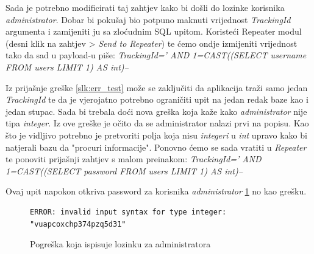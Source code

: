 Sada je potrebno modificirati taj zahtjev kako bi došli do lozinke korisnika \textit{administrator}. Dobar bi pokušaj bio potpuno maknuti vrijednost \textit{TrackingId} argumenta i zamijeniti ju sa zloćudnim SQL upitom.
Koristeći Repeater modul (desni klik na zahtjev > \textit{Send to Repeater}) te ćemo ondje izmijeniti vrijednost tako da sad u payload-u piše: \newline
\textit{TrackingId=' AND 1=CAST((SELECT username FROM users LIMIT 1) AS int)--}

Iz prijašnje greške \ref{slk:err_test} može se zaključiti da aplikacija traži samo jedan \textit{TrackingId} te da je vjerojatno potrebno ograničiti upit na jedan redak baze kao i jedan stupac.
Sada bi trebala doći nova greška koja kaže kako \textit{administrator} nije tipa \textit{integer}. Iz ove greške je očito da se administrator nalazi prvi na popisu. Kao što je vidljivo potrebno je pretvoriti polja koja nisu \textit{integeri} u \textit{int} upravo kako bi 
natjerali bazu da "procuri informacije".
Ponovno ćemo se sada vratiti u \textit{Repeater} te ponoviti prijašnji zahtjev s malom preinakom:\newline
\textit{TrackingId=' AND 1=CAST((SELECT password FROM users LIMIT 1) AS int)--}

Ovaj upit napokon otkriva password za korisnika \textit{administrator} \ref{slk:err_good} no kao grešku.
\begin{figure}[H]
    \begin{lstlisting}[frame=single, breaklines]
        ERROR: invalid input syntax for type integer: "vuapcoxchp374pzq5d31"
    \end{lstlisting}
    \caption{Pogreška koja ispisuje lozinku za administratora}
    \label{slk:err_good}
\end{figure}
\newpage %
